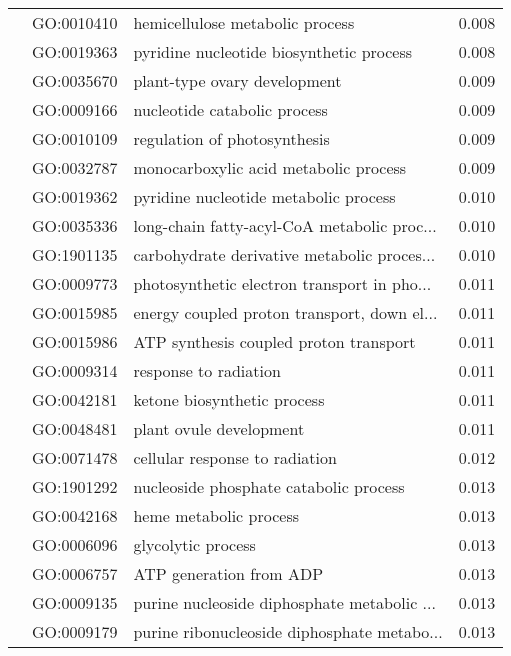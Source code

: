 \begin{longtable}{lllr}
   & GO:0010410 &              hemicellulose metabolic process &         0.008 \\
   & GO:0019363 &     pyridine nucleotide biosynthetic process &         0.008 \\
   & GO:0035670 &                 plant-type ovary development &         0.009 \\
   & GO:0009166 &                 nucleotide catabolic process &         0.009 \\
   & GO:0010109 &                 regulation of photosynthesis &         0.009 \\
   & GO:0032787 &        monocarboxylic acid metabolic process &         0.009 \\
   & GO:0019362 &        pyridine nucleotide metabolic process &         0.010 \\
   & GO:0035336 &  long-chain fatty-acyl-CoA metabolic proc... &         0.010 \\
   & GO:1901135 &  carbohydrate derivative metabolic proces... &         0.010 \\
   & GO:0009773 &  photosynthetic electron transport in pho... &         0.011 \\
   & GO:0015985 &  energy coupled proton transport, down el... &         0.011 \\
   & GO:0015986 &       ATP synthesis coupled proton transport &         0.011 \\
   & GO:0009314 &                        response to radiation &         0.011 \\
   & GO:0042181 &                  ketone biosynthetic process &         0.011 \\
   & GO:0048481 &                      plant ovule development &         0.011 \\
   & GO:0071478 &               cellular response to radiation &         0.012 \\
   & GO:1901292 &       nucleoside phosphate catabolic process &         0.013 \\
   & GO:0042168 &                       heme metabolic process &         0.013 \\
   & GO:0006096 &                           glycolytic process &         0.013 \\
   & GO:0006757 &                      ATP generation from ADP &         0.013 \\
   & GO:0009135 &  purine nucleoside diphosphate metabolic ... &         0.013 \\
   & GO:0009179 &  purine ribonucleoside diphosphate metabo... &         0.013 \\

\end{longtable}
